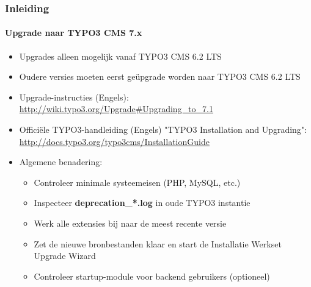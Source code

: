 \begin{frame}[fragile]
	\frametitle{Inleiding}
	\framesubtitle{Upgrade naar TYPO3 CMS 7.x}

	\begin{itemize}
		\item Upgrades alleen mogelijk vanaf TYPO3 CMS 6.2 LTS
		\item Oudere versies moeten eerst geüpgrade worden naar TYPO3 CMS 6.2 LTS
	\end{itemize}

	\begin{itemize}

		\item Upgrade-instructies (Engels):\newline
			\smaller\url{http://wiki.typo3.org/Upgrade#Upgrading_to_7.1}\normalsize
		\item Officiële TYPO3-handleiding (Engels) "TYPO3 Installation and Upgrading":
			\smaller\url{http://docs.typo3.org/typo3cms/InstallationGuide}\normalsize
		\item Algemene benadering:
			\begin{itemize}
				\item Controleer minimale systeemeisen \small(PHP, MySQL, etc.)
				\item Inspecteer \textbf{deprecation\_*.log} in oude TYPO3 instantie
				\item Werk alle extensies bij naar de meest recente versie
				\item Zet de nieuwe bronbestanden klaar en start de Installatie Werkset \textrightarrow Upgrade Wizard
				\item Controleer startup-module voor backend gebruikers (optioneel)
			\end{itemize}
	\end{itemize}

\end{frame}

